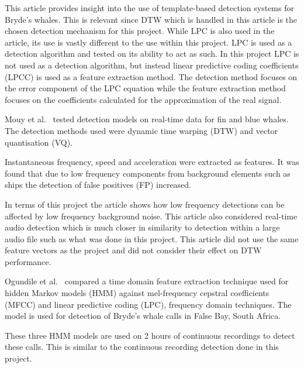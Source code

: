 This article provides insight into the use of template-based detection systems for 
Bryde's whales. This is relevant since \acs{DTW} which is handled in this article is the chosen 
detection mechanism for this project. While \acs{LPC} is also used in the article, its use is 
vastly different to the use within this project. \acs{LPC} is used as a detection algorithm 
and tested on its ability to act as such. In this project \acs{LPC} is not used as a detection 
algorithm, but instead linear predictive coding coefficients (\acs{LPCC}) is used as a feature extraction method. 
The detection method focuses on 
the error component of the \acs{LPC} equation while the feature extraction method focuses 
on the coefficients calculated for the approximation of the real signal.

\label{sec:real-time}

Mouy et al.~\cite{dtw-vq} tested detection models on 
real-time data for fin and blue whales. The 
detection methods used were dynamic time warping (\acs{DTW}) and vector quantisation (\acs{VQ}).

Instantaneous frequency, speed and acceleration were extracted as features. It was 
found that due to low frequency components from background elements such as ships the 
detection of false positives (\acs{FP}) increased.

In terms of this project the article shows how low frequency detections can be affected 
by low frequency background noise. This article also considered real-time audio detection 
which is much closer in similarity to detection within a large audio file such as what was 
done in this project. This article did not use the same feature vectors as the project and 
did not consider their effect on \acs{DTW} performance.

\label{sec:hmm-bryde}

Ogundile et al.~\cite{hmm} compared a time domain feature extraction technique used for hidden Markov models (\acs{HMM}) against 
mel-frequency cepstral coefficients (\acs{MFCC}) and linear predictive coding (\acs{LPC}), frequency domain techniques. The model is used for detection of Bryde's 
whale calls in False Bay, South Africa.

These three \acs{HMM} models are used on 2 hours of continuous recordings to detect these 
calls. This is similar to the continuous recording detection done in this project.

